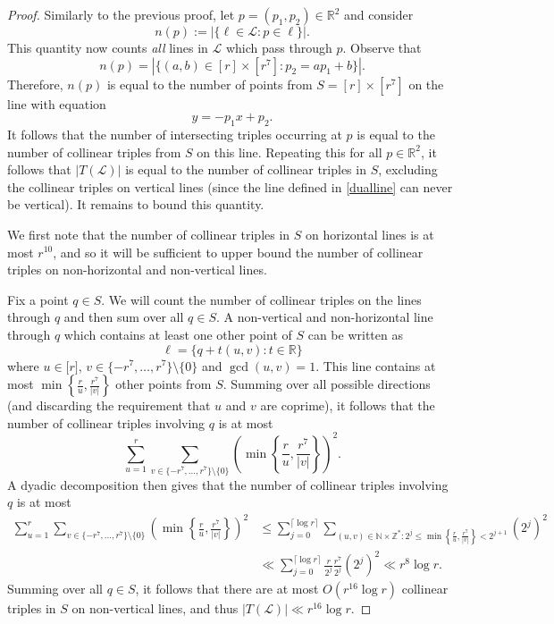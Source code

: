 \documentclass[11pt]{amsart}
\newcommand{\cL}{\mathcal{L}}
\theoremstyle{remark}
\begin{document}
\begin{proof}
    Similarly to the previous proof, let $p=(p_1,p_2) \in \mathbb R^2$ and consider
    \[
n(p):=| \{ \ell \in \mathcal L : p \in \ell \}|.
    \]
    This quantity now counts \textit{all} lines in $\cL$ which pass through $p$. Observe that
    \[
    n(p)= |\{(a,b) \in [r] \times [r^7] : p_2=ap_1+b \}|.
    \]
    Therefore, $n(p)$ is equal to the number of points from $S=[r] \times  [r^7]$ on the line with equation 
    \begin{equation} \label{dualline}
    y=-p_1x+p_2.
    \end{equation}
    It follows that the number of intersecting triples occurring at $p$ is equal to the number of collinear triples from $S$ on this line. Repeating this for all $p \in \mathbb R^2$, it follows that $|T(\cL)|$ is equal to the number of collinear triples in $S$, excluding the collinear triples on vertical lines (since the line defined in \eqref{dualline} can never be vertical). It remains to bound this quantity.

   We first note that the number of collinear triples in $S$ on horizontal lines is at most $r^{10}$, and so it will be sufficient to upper bound the number of collinear triples on non-horizontal and non-vertical lines.
   
   
   Fix a point $q \in S$. We will count the number of collinear triples on the lines through $q$ and then sum over all $q \in S$. A non-vertical and non-horizontal line through $q$ which contains at least one other point of $S$ can be written as
   \[
   \ell= \{ q +  t(u,v) : t \in \mathbb R \}
   \]
   where $u \in \mathbb [r]$, $v \in \{-r^7,\dots,r^7\} \setminus \{0\}$ and $\gcd(u,v)=1$.  This line contains at most $\min \left \{ \frac{r}{u}, \frac{r^7}{|v|} \right \}$ other points from $S$. Summing over all possible directions (and discarding the requirement that $u$ and $v$ are coprime), it follows that the number of collinear triples involving $q$ is at most
   \[
   \sum_{u=1}^{r} \sum_{v \in \{-r^7,\dots,r^7\} \setminus \{0\}}  \left(\min \left \{ \frac{r}{u}, \frac{r^7}{|v|} \right\}  \right )^2.
   \]
   A dyadic decomposition then gives that the number of collinear triples involving $q$ is at most
   \begin{align*}
      \sum_{u=1}^{r} \sum_{v \in \{-r^7,\dots,r^7\} \setminus \{0\}} \left (\min \left \{ \frac{r}{u}, \frac{r^7}{|v|} \right \} \right )^2 & \leq  \sum_{j=0}^{\lceil\log r \rceil} \sum_{(u,v) \in \mathbb N \times  \mathbb Z^* : 2^j \leq \min \left \{ \frac{r}{u}, \frac{r^7}{|v|} \right \} < 2^{j+1}} (2^j)^2
      \\& \ll \sum_{j=0}^{ \lceil \log r \rceil} \frac{r}{2^j} \frac{r^7}{2^j}(2^j)^2 \ll r^{8} \log r.
   \end{align*}
   Summing over all $q \in S$, it follows that there are at most $O(r^{16}\log r)$ collinear triples in $S$ on non-vertical lines, and thus $|T(\cL)| \ll r^{16} \log r$. 


\end{proof}
\end{document}
